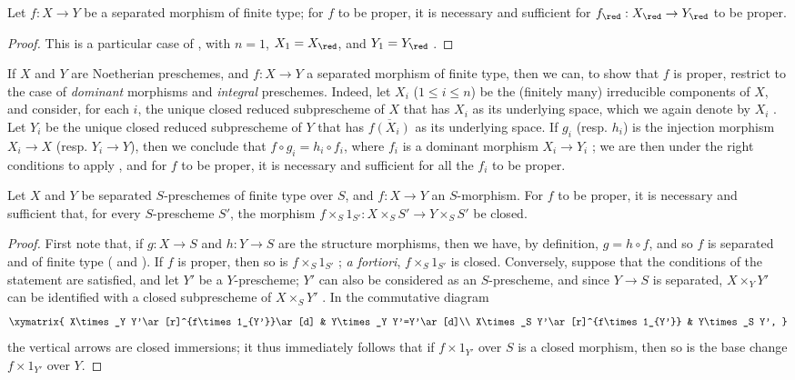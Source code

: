 \begin{corollary}[5.4.6]
\label{II.5.4.6}
Let $f:X\to Y$ be a separated morphism of finite type; for $f$ to be proper, it is necessary and sufficient for $f_\red:X_\red\to Y_\red$ to be proper.
\end{corollary}

\begin{proof}
This is a particular case of , with $n=1$, $X_1=X_\red$, and $Y_1=Y_\red$ .
\end{proof}

\begin{env}[5.4.7]
\label{II.5.4.7}
If $X$ and $Y$ are Noetherian preschemes, and $f:X\to Y$ a separated morphism of finite type, then we can, to show that $f$ is proper, restrict to the case of \emph{dominant} morphisms and \emph{integral} preschemes.
Indeed, let $X_i$ ($1\leq i\leq n$) be the (finitely many) irreducible components of $X$, and consider, for each $i$, the unique closed reduced subprescheme of $X$ that has $X_i$ as its underlying space, which we again denote by $X_i$ .
Let $Y_i$ be the unique closed reduced subprescheme of $Y$ that has $\overline{f(X_i)}$ as its underlying space.
If $g_i$ (resp. $h_i$) is the injection morphism $X_i\to X$ (resp. $Y_i\to Y$), then we conclude that $f\circ g_i=h_i\circ f_i$, where $f_i$ is a dominant morphism $X_i\to Y_i$ ;
we are then under the right conditions to apply , and for $f$ to be proper, it is necessary and sufficient for all the $f_i$ to be proper.
\end{env}

\begin{corollary}[5.4.8]
\label{II.5.4.8}
Let $X$ and $Y$ be separated $S$-preschemes of finite type over $S$, and $f:X\to Y$ an $S$-morphism.
For $f$ to be proper, it is necessary and sufficient that, for every $S$-prescheme $S'$, the morphism $f\times_S 1_{S'}:X\times_S S'\to Y\times_S S'$ be closed.
\end{corollary}

\begin{proof}
First note that, if $g:X\to S$ and $h:Y\to S$ are the structure morphisms, then we have, by definition, $g=h\circ f$, and so $f$ is separated and of finite type ( and ).
If $f$ is proper, then so is $f\times_S 1_{S'}$ ; \emph{a fortiori}, $f\times_S 1_{S'}$ is closed.
Conversely, suppose that the conditions of the statement are satisfied, and let $Y'$ be a $Y$-prescheme;
$Y'$ can also be considered as an $S$-prescheme, and since $Y\to S$ is separated, $X\times_Y Y'$ can be identified with a closed subprescheme of $X\times_S Y'$ .
In the commutative diagram
\[
  \xymatrix{
    X\times_Y Y'\ar[r]^{f\times1_{Y'}}\ar[d] &
    Y\times_Y Y'=Y'\ar[d]\\
    X\times_S Y'\ar[r]^{f\times1_{Y'}} &
    Y\times_S Y',
  }
\]
the vertical arrows are closed immersions; it thus immediately follows that if $f\times1_{Y'}$ over $S$ is a closed morphism, then so is the base change $f\times1_{Y'}$ over $Y$.
\end{proof}

